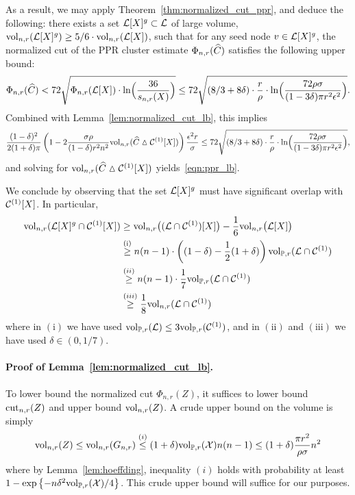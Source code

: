 	As a result, we may apply Theorem~\ref{thm:normalized_cut_ppr}, and deduce the following: there exists a set $\mathcal{L}[X]^g \subset \mathcal{L}$ of large volume, $\mathrm{vol}_{n,r}(\mathcal{L}[X]^g) \geq 5/6 \cdot \mathrm{vol}_{n,r}(\mathcal{L}[X])$, such that for any seed node $v \in \mathcal{L}[X]^g$, the normalized cut of the PPR cluster estimate $\Phi_{n,r}(\widehat{C})$ satisfies the following upper bound:
	\begin{equation*}
	\Phi_{n,r}(\widehat{C}) < 72\sqrt{\Phi_{n,r}(\mathcal{L}[X]) \cdot \ln\Bigl(\frac{36}{s_{n,r}(X)}\Bigr)} \leq  72\sqrt{(8/3 + 8\delta) \cdot \frac{r}{\rho} \cdot \ln\Bigl(\frac{72 \rho \sigma}{(1 - 3\delta)\pi r^2 \epsilon^2}\Bigr)}.
	\end{equation*}	
	Combined with Lemma~\ref{lem:normalized_cut_lb}, this implies
	\begin{equation}
	\label{pf:ppr_lb_3}
	\frac{(1 - \delta)^2}{2(1 + \delta)\pi} \left(1 - 2 \frac{\sigma \rho}{(1 - \delta) r^2 n^2} \mathrm{vol}_{n,r}(\widehat{C} \vartriangle \mathcal{C}^{(1)}[X]) \right) \frac{\epsilon^2 r}{\sigma} \leq 72\sqrt{(8/3 + 8\delta) \cdot \frac{r}{\rho} \cdot \ln\Bigl(\frac{72 \rho \sigma}{(1 - 3\delta)\pi r^2 \epsilon^2}\Bigr)},
	\end{equation}
	and solving for $\mathrm{vol}_{n,r}(\widehat{C} \vartriangle \mathcal{C}^{(1)}[X])$ yields~\eqref{eqn:ppr_lb}. 
	
	We conclude by observing that the set $\mathcal{L}[X]^g$ must have significant overlap with $\mathcal{C}^{(1)}[X]$. In particular,
	\begin{align*}
	\mathrm{vol}_{n,r}(\mathcal{L}[X]^g \cap \mathcal{C}^{(1)}[X]) & \geq \mathrm{vol}_{n,r}\bigl((\mathcal{L} \cap \mathcal{C}^{(1)})[X]\bigr) - \frac{1}{6}\mathrm{vol}_{n,r}\bigl(\mathcal{L}[X]\bigr) \\
	& \overset{\mathrm{(i)}}{\geq} n(n-1) \cdot \left((1 - \delta) - \frac{1}{2}(1 + \delta)\right)\mathrm{vol}_{\mathbb{P},r}( \mathcal{L} \cap \mathcal{C}^{(1)}) \\
	& \overset{\mathrm(ii)}{\geq} n(n - 1) \cdot \frac{1}{7} \mathrm{vol}_{\mathbb{P},r}( \mathcal{L} \cap \mathcal{C}^{(1)}) \\
	& \overset{\mathrm(iii)}{\geq} \frac{1}{8} \mathrm{vol}_{n,r}( \mathcal{L} \cap \mathcal{C}^{(1)})
	\end{align*}
	where in $\mathrm{(i)}$ we have used $\mathrm{vol}_{\mathbb{P},r}(\mathcal{L}) \leq 3 \mathrm{vol}_{\mathbb{P},r}(\mathcal{C}^{(1)})$, and in $\mathrm{(ii)}$ and $\mathrm{(iii)}$ we have used $\delta \in (0,1/7)$.

\paragraph{Proof of Lemma~\ref{lem:normalized_cut_lb}.}
	To lower bound the normalized cut $\Phi_{n,r}(Z)$, it suffices to lower bound $\mathrm{cut}_{n,r}(Z)$ and upper bound $\mathrm{vol}_{n,r}(Z)$. A crude upper bound on the volume is simply 
	\begin{equation}
	\label{eqn:normalized_cut_lb_pf4}
	\mathrm{vol}_{n,r}(Z) \leq \mathrm{vol}_{n,r}(G_{n,r}) \overset{(i)}{\leq} (1 + \delta)  \mathrm{vol}_{\mathbb{P},r}(\mathcal{X}) n (n - 1) \leq (1 + \delta)\frac{\pi r^2}{\rho \sigma} n^2
	\end{equation}
	where by Lemma~\ref{lem:hoeffding}, inequality $(i)$ holds with probability at least $1 - \exp\left\{-n\delta^2 \mathrm{vol}_{\mathbb{P},r}(\mathcal{X})/4\right\}$. This crude upper bound will suffice for our purposes.
	
